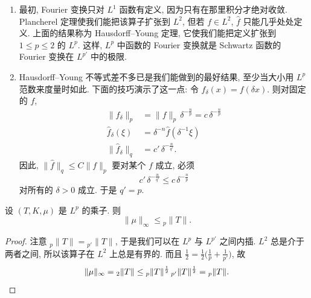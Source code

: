 \begin{remark}\label{rem:1.15}
\begin{enumerate}[label=\alph*)]
\item 最初, Fourier 变换只对 $L^1$ 函数有定义, 因为只有在那里积分才绝对收敛. Plancherel 定理使我们能把该算子扩张到 $L^2$, 但若 $f\in L^2$, $\hat{f}$ 只能几乎处处定义. 上面的结果称为 Hausdorff--Young 定理, 它使我们能把定义扩张到 $1\leq p\leq 2$ 的 $L^p$. 这样, $L^p$ 中函数的 Fourier 变换就是 Schwartz 函数的 Fourier 变换在 $L^{p'}$ 中的极限.
\item Hausdorff--Young 不等式差不多已是我们能做到的最好结果, 至少当大小用 $L^p$ 范数来度量时如此. 下面的技巧演示了这一点: 令 $f_{\delta}(x)=f(\delta x)$. 则对固定的 $f$,
\begin{align*}
\|f_{\delta}\|_p&=\|f\|_p\,\delta^{-\frac{n}{p}}=c\,\delta^{-\frac{n}{p}} \\
\hat{f}_{\delta}(\xi)&=\delta^{-n}\hat{f}(\delta^{-1}\xi) \\
\|\hat{f}_{\delta}\|_q&=c'\,\delta^{-\frac{n}{q'}}.
\end{align*}
因此, $\|\hat{f}\|_q\leq C\|f\|_p$ 要对某个 $f$ 成立, 必须
\[
c'\,\delta^{-\frac{n}{q'}}\leq c\,\delta^{-\frac{n}{p}}
\]
对所有的 $\delta>0$ 成立. 于是 $q'=p$.
\end{enumerate}
\end{remark}

\begin{lemma}\label{lem:1.16}
设 $(T,K,\mu)$ 是 $L^p$ 的乘子. 则
\[
\|\mu\|_{\infty}\leq{}_p\|T\|.
\]
\end{lemma}

\begin{proof}
注意 ${}_p\|T\|={}_{p'}\|T\|$, 于是我们可以在 $L^p$ 与 $L^{p'}$ 之间内插. $L^2$ 总是介于两者之间, 所以该算子在 $L^2$ 上总是有界的. 而且 $\frac{1}{2}=\frac{1}{2}\bigl(\frac{1}{p}+\frac{1}{p'}\bigr)$, 故
\[
\|\mu\|_{\infty}={}_2\|T\|\leq{}_p\|T\|^{\frac{1}{2}}\,{}_{p'}\|T\|^{\frac{1}{2}}={}_p\|T\|. \qedhere
\]
\end{proof}

